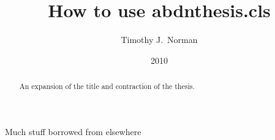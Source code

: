 \documentclass[phd]{abdnthesis}
\title{How to use abdnthesis.cls}
\author{Timothy J.\ Norman}
\date{2010}
\begin{document}

\maketitle
\makedeclaration


\begin{abstract}
  An expansion of the title and contraction of the thesis.
\end{abstract}

\begin{acknowledgements}
  Much stuff borrowed from elsewhere
\end{acknowledgements}

 
\tableofcontents
\listoffigures
\listoftables














\appendix



\end{document}
